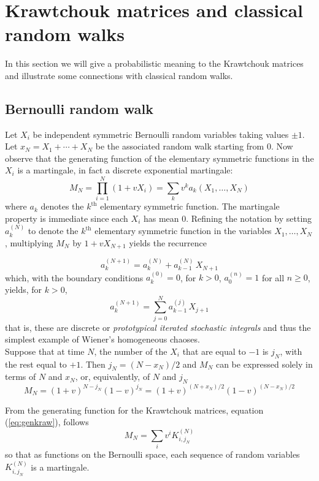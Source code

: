 \documentclass[12pt]{article}
\numberwithin{equation}{section}
\begin{document}

\section{Krawtchouk matrices and classical random walks}
\label{sec:classical}

In this section we will give a probabilistic meaning to
the Krawtchouk matrices and illustrate some connections with classical random walks.\\

\subsection{ Bernoulli random walk }
Let $X_i$ be independent symmetric Bernoulli random variables taking
values $\pm1$. Let $x_N=X_1+\cdots+X_N$ be the associated random
walk starting from $0$. Now observe that the generating function of
the elementary symmetric functions in the $X_i$ is a martingale, in
fact a discrete exponential martingale:
$$
   M_N = \prod_{i=1}^N(1+vX_i)=\sum_k v^k 
           a_k(X_1,\ldots,X_N)
$$
where $a_k$ denotes the $k^{\mathrm{th}}$ elementary symmetric
function. 
The martingale property is immediate since each $X_i$ has mean $0$.
Refining the notation by setting $a_k^{(N)}$ to denote the $k^{\mathrm{th}}$ elementary symmetric
function in the variables $X_1,\ldots, X_N$, multiplying $M_N$ by $1+vX_{N+1}$ yields the recurrence

$$
a_k^{(N+1)} = a_k^{(N)}+a_{k-1}^{(N)}\,X_{N+1}
$$
which, with the boundary conditions $a_k^{(0)}=0$, for $k>0$, $a_0^{(n)}=1$ for all $n\ge0$,  yields, for $k>0$,
$$
a_k^{(N+1)} = \sum_{j=0}^N a_{k-1}^{(j)}\,X_{j+1}
$$
that is, these are discrete or {\sl prototypical iterated stochastic integrals} and thus the simplest
example of Wiener's homogeneous chaoses. \\


Suppose that at time $N$, the number of the $X_i$ that are equal to $-1$
is $j_N$, with the rest equal to $+1$. Then  $j_N= (N-x_N)/2$ 
and $M_N$ can be expressed solely in terms of $N$ and $x_N$, or, 
equivalently, of $N$ and $j_N$
$$
       M_N = (1+v)^{N-j_N}(1-v)^{j_N} 
           = (1+v)^{(N+x_N)/2}(1-v)^{(N-x_N)/2}  
$$



From the generating function for the Krawtchouk
matrices, equation (\ref{eq:genkraw}), follows 
$$
    M_N = \sum_iv^iK^{(N)}_{i,j_N}
$$
so that as functions on the Bernoulli space, each sequence of random
variables $K^{(N)}_{i,j_N}$ is a martingale. \\
\end{document}
